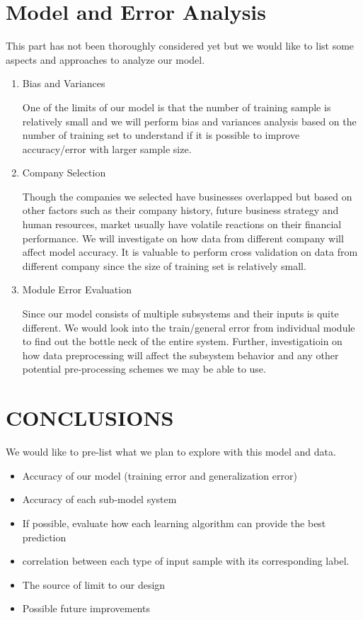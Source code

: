 \documentclass[letterpaper, 10 pt, conference]{ieeeconf}  %
\begin{document}
\section{Model and Error Analysis}
This part has not been thoroughly considered yet but we would like to list some aspects and approaches to analyze our model.
\begin{enumerate}
\item Bias and Variances

One of the limits of our model is that the number of training sample is relatively small and we will perform bias and variances analysis based on the number of training set to understand if it is possible to improve accuracy/error with larger sample size.

\item Company Selection

Though the companies we selected have businesses overlapped but based on other factors such as their company history, future business strategy and human resources, market usually have volatile reactions on their financial performance. We will investigate on how data from different company will affect model accuracy. It is valuable to perform cross validation on data from different company since the size of training set is relatively small.

\item Module Error Evaluation

Since our model consists of multiple subsystems and their inputs is quite different. We would look into the train/general error from individual module to find out the bottle neck of the entire system. Further, investigatioin on how data preprocessing will affect the subsystem behavior and any other potential pre-processing schemes we may be able to use.

\end{enumerate}



\section{CONCLUSIONS}

We would like to pre-list what we plan to explore with this model and data.
\begin{itemize}
\item Accuracy of our model (training error and generalization error)
\item Accuracy of each sub-model system
\item If possible, evaluate how each learning algorithm can provide the best prediction 
\item correlation between each type of input sample with its corresponding label.
\item The source of limit to our design
\item Possible future improvements
\end{itemize}
\end{document}
